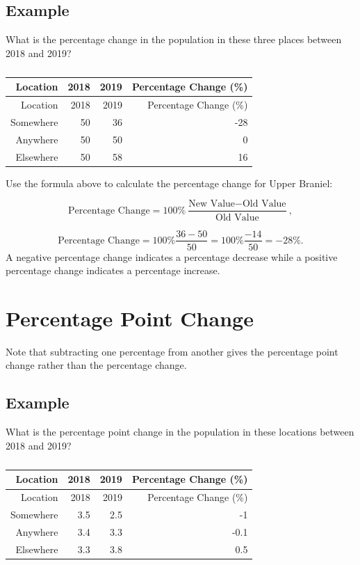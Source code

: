 \documentclass[
]{book}
\begin{document}
\hypertarget{example-10}{%
\subsection{Example}\label{example-10}}

What is the percentage change in the population in these three places between 2018 and 2019?

\begin{longtable}[]{@{}rrrr@{}}
\caption{\label{tab:table10}}\tabularnewline
\toprule
Location & 2018 & 2019 & Percentage Change (\%) \\
\midrule
\endfirsthead
\toprule
Location & 2018 & 2019 & Percentage Change (\%) \\
\midrule
\endhead
Somewhere & 50 & 36 & -28 \\
Anywhere & 50 & 50 & 0 \\
Elsewhere & 50 & 58 & 16 \\
\bottomrule
\end{longtable}

Use the formula above to calculate the percentage change for Upper Braniel:

\[ \textrm{Percentage Change} = 100\% \frac{\textrm{New Value} - \textrm{Old Value}}{\textrm{Old Value}},\]

\[ \textrm{Percentage Change} = 100\% \frac{36 - 50}{50} = 100\% \frac{-14}{50} = -28\%.\]
A negative percentage change indicates a percentage decrease while a positive percentage change indicates a percentage increase.

\hypertarget{percentage-point-change}{%
\section{Percentage Point Change}\label{percentage-point-change}}

Note that subtracting one percentage from another gives the percentage point change rather than the percentage change.

\hypertarget{example-11}{%
\subsection{Example}\label{example-11}}

What is the percentage point change in the population in these locations between 2018 and 2019?

\begin{longtable}[]{@{}rrrr@{}}
\caption{\label{tab:table11}}\tabularnewline
\toprule
Location & 2018 & 2019 & Percentage Change (\%) \\
\midrule
\endfirsthead
\toprule
Location & 2018 & 2019 & Percentage Change (\%) \\
\midrule
\endhead
Somewhere & 3.5 & 2.5 & -1 \\
Anywhere & 3.4 & 3.3 & -0.1 \\
Elsewhere & 3.3 & 3.8 & 0.5 \\
\bottomrule
\end{longtable}
\end{document}
